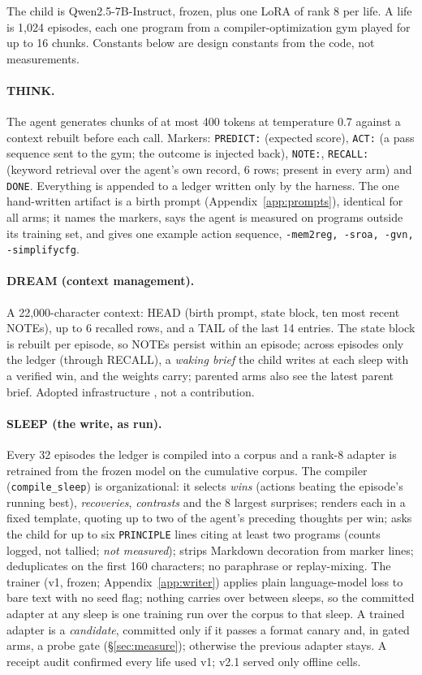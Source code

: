 \documentclass{article}
\newcommand{\nm}{\emph{not measured}}
\begin{document}
The child is Qwen2.5-7B-Instruct, frozen, plus one LoRA of rank 8 per life. A life is 1{,}024 episodes, each one program from a compiler-optimization gym played for up to 16 chunks. Constants below are design constants from the code, not measurements.

\paragraph{THINK.} The agent generates chunks of at most 400 tokens at temperature 0.7 against a context rebuilt before each call. Markers: \texttt{PREDICT:} (expected score), \texttt{ACT:} (a pass sequence sent to the gym; the outcome is injected back), \texttt{NOTE:}, \texttt{RECALL:} (keyword retrieval over the agent's own record, 6 rows; present in every arm) and \texttt{DONE}. Everything is appended to a ledger written only by the harness. The one hand-written artifact is a birth prompt (Appendix~\ref{app:prompts}), identical for all arms; it names the markers, says the agent is measured on programs outside its training set, and gives one example action sequence, \texttt{-mem2reg, -sroa, -gvn, -simplifycfg}.

\paragraph{DREAM (context management).} A 22{,}000-character context: HEAD (birth prompt, state block, ten most recent NOTEs), up to 6 recalled rows, and a TAIL of the last 14 entries. The state block is rebuilt per episode, so NOTEs persist within an episode; across episodes only the ledger (through RECALL), a \emph{waking brief} the child writes at each sleep with a verified win, and the weights carry; parented arms also see the latest parent brief. Adopted infrastructure \citep{park2023generative,packer2023memgpt}, not a contribution.

\paragraph{SLEEP (the write, as run).} Every 32 episodes the ledger is compiled into a corpus and a rank-8 adapter is retrained from the frozen model on the cumulative corpus. The compiler (\texttt{compile\_sleep}) is organizational: it selects \emph{wins} (actions beating the episode's running best), \emph{recoveries}, \emph{contrasts} and the 8 largest surprises; renders each in a fixed template, quoting up to two of the agent's preceding thoughts per win; asks the child for up to six \texttt{PRINCIPLE} lines citing at least two programs (counts logged, not tallied; \nm); strips Markdown decoration from marker lines; deduplicates on the first 160 characters; no paraphrase or replay-mixing. The trainer (v1, frozen; Appendix~\ref{app:writer}) applies plain language-model loss to bare text with no seed flag; nothing carries over between sleeps, so the committed adapter at any sleep is one training run over the corpus to that sleep. A trained adapter is a \emph{candidate}, committed only if it passes a format canary and, in gated arms, a probe gate (\S\ref{sec:measure}); otherwise the previous adapter stays. A receipt audit confirmed every life used v1; v2.1 served only offline cells.
\end{document}
